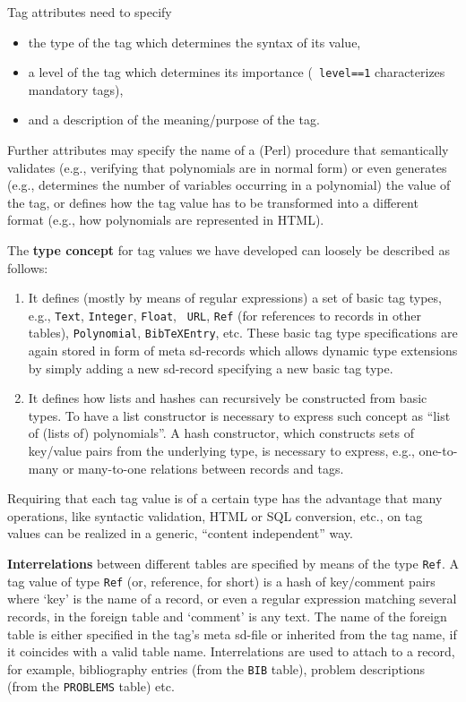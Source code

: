 \documentclass[11pt,a4paper]{article}
\begin{document}
Tag attributes need to specify
\begin{itemize}
\item the type of the tag which determines the syntax of its value,
\item a level of the tag which determines its importance ({\tt
level==1} characterizes mandatory tags),
\item and a description of the meaning/purpose of the tag.
\end{itemize}

Further attributes may specify the name of a (Perl) procedure that
semantically validates (e.g., verifying that polynomials are in normal
form) or even generates (e.g., determines the number of variables
occurring in a polynomial) the value of the tag, or defines how the tag
value has to be transformed into a different format (e.g., how
polynomials are represented in HTML).
\medskip

The {\bf type concept} for tag values we have developed can loosely
be described as follows:
\begin{enumerate}
\item It defines (mostly by means of regular expressions) a set of
  basic tag types, e.g., {\tt Text}, {\tt Integer}, {\tt Float}, {\tt
    URL}, {\tt Ref} (for references to records in other tables),
  {\tt Polynomial}, {\tt BibTeXEntry}, etc. These basic tag type
  specifications are again stored in form of meta sd-records which
  allows dynamic type extensions by simply adding a new sd-record
  specifying a new basic tag type. 
\item It defines how lists and hashes can recursively be constructed
from basic types. To have a list constructor is necessary to express
such concept as ``list of (lists of) polynomials''. A hash
constructor, which constructs sets of key/value pairs from the
underlying type, is necessary to express, e.g., one-to-many or
many-to-one relations between records and tags.
\end{enumerate}
Requiring that each tag value is of a certain type has the advantage
that many operations, like syntactic validation, HTML or SQL
conversion, etc., on tag values can be realized in a generic,
``content independent'' way.
\medskip

{\bf Interrelations} between different tables are specified by means
of the type {\tt Ref}. A tag value of type {\tt Ref} (or, reference,
for short) is a hash of key/comment pairs where `key' is the name of a
record, or even a regular expression matching several records, in the
foreign table and `comment' is any text. The name of the foreign table
is either specified in the tag's meta sd-file or inherited from the
tag name, if it coincides with a valid table name.  Interrelations are
used to attach to a record, for example, bibliography entries (from
the {\tt BIB} table), problem descriptions (from the {\tt PROBLEMS}
table) etc.
\medskip
\end{document}
